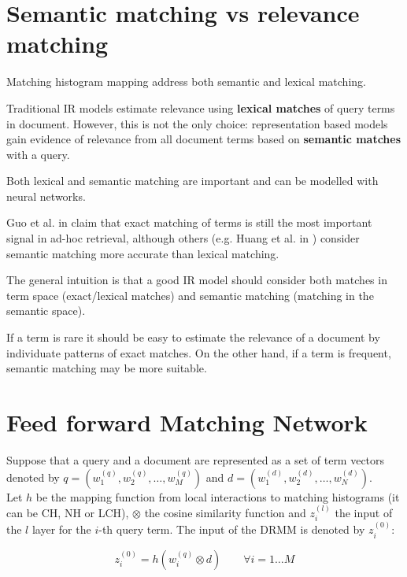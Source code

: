 \section{Semantic matching vs relevance matching}

Matching histogram mapping address both semantic and lexical matching.

Traditional IR models estimate relevance using \textbf{lexical matches} of query terms in document. However, this is not the only choice: representation based models gain evidence of relevance from all document terms based on \textbf{semantic matches} with a query.

Both lexical and semantic matching are important and can be modelled with neural networks.

Guo et al. in \cite{drmm} claim that exact matching of terms is still the most important signal in ad-hoc retrieval, although others (e.g. Huang et al. in \cite{dssm}) consider semantic matching more accurate than lexical matching.

The general intuition is that a good IR model should consider both matches in term space (exact/lexical matches) and semantic matching (matching in the semantic space).

If a term is rare it should be easy to estimate the relevance of a document by individuate patterns of exact matches. On the other hand, if a term is frequent, semantic matching may be more suitable.

\section{Feed forward Matching Network}

Suppose that a query and a document are represented as a set of term vectors denoted by $q = (w_1^{(q)}, w_2^{(q)}, \dots, w_M^{(q)})$
and $d = (w_1^{(d)}, w_2^{(d)}, \dots, w_N^{(d)})$.\\

Let $h$ be the mapping function from local interactions to matching histograms (it can be CH, NH or LCH), $\otimes$ the cosine similarity function and $z_i^{(l)}$ the input of the $l$ layer for the $i$-th query term. The input of the DRMM is denoted by $z_i^{(0)}$:

\begin{equation}
\label{eq:inpFst}
\tag{Input to the first layer of ffnn}
z_i^{(0)} = h(w_i^{(q)} \otimes d) \qquad \forall i = 1 \dots M
\end{equation}

